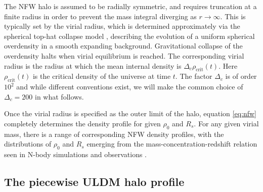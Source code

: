 \documentclass{pasa}%
\begin{document}
The NFW halo is assumed to be radially symmetric, and requires truncation at a finite radius in order to prevent the mass integral diverging as $r\rightarrow \infty$. This is typically set by the virial radius, which is  determined approximately via the spherical top-hat collapse model \cite{White:2000jv, Suto:2015jdt, Herrera:2017epn}, describing the evolution of a uniform spherical overdensity in a smooth expanding background. Gravitational collapse of the overdensity halts when virial equilibrium is reached. The corresponding virial radius is the radius at which the mean internal density is $\Delta_c \rho_\mathrm{crit}(t)$. Here $\rho_\mathrm{crit}(t)$ is the critical density of the universe at time $t$. The  factor $\Delta_c$ is of order $10^2$ and while different conventions exist, we will make the common choice of $\Delta_c = 200$ \cite{Richings:2018} in what follows. 

Once the virial radius is specified as the outer limit of the halo, equation \ref{eq:nfw} completely determines the density profile for given  $\rho_0$ and $R_s$. For any given virial mass, there is a range of corresponding NFW density profiles, with the distributions of $\rho_0$ and $R_s$ emerging from the mass-concentration-redshift relation seen in N-body simulations and observations \cite{Ludlow:2013vxa, Ragagnin:2018enf}. 

\subsection{The piecewise ULDM halo profile}
\end{document}
